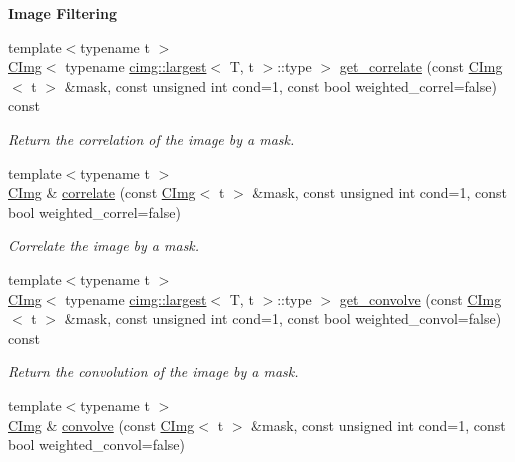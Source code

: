 \begin{Indent}{\bf Image Filtering}\par
{\em \label{_amgrp51e924689f77c6341f19cc4025b98797}
 }\begin{DoxyCompactItemize}
\item 
{\footnotesize template$<$typename t $>$ }\\\hyperlink{structcimg__library_1_1_c_img}{CImg}$<$ typename \hyperlink{structcimg__library_1_1cimg_1_1largest}{cimg::largest}$<$ T, t $>$::type $>$ \hyperlink{structcimg__library_1_1_c_img_ac97ccdd3c9e08e879a0273304c86406a}{get\_\-correlate} (const \hyperlink{structcimg__library_1_1_c_img}{CImg}$<$ t $>$ \&mask, const unsigned int cond=1, const bool weighted\_\-correl=false) const 
\begin{DoxyCompactList}\small\item\em Return the correlation of the image by a mask. \item\end{DoxyCompactList}\item 
{\footnotesize template$<$typename t $>$ }\\\hyperlink{structcimg__library_1_1_c_img}{CImg} \& \hyperlink{structcimg__library_1_1_c_img_a5c73733e5a7af93e124a7999a1dc0556}{correlate} (const \hyperlink{structcimg__library_1_1_c_img}{CImg}$<$ t $>$ \&mask, const unsigned int cond=1, const bool weighted\_\-correl=false)
\begin{DoxyCompactList}\small\item\em Correlate the image by a mask. \item\end{DoxyCompactList}\item 
{\footnotesize template$<$typename t $>$ }\\\hyperlink{structcimg__library_1_1_c_img}{CImg}$<$ typename \hyperlink{structcimg__library_1_1cimg_1_1largest}{cimg::largest}$<$ T, t $>$::type $>$ \hyperlink{structcimg__library_1_1_c_img_a828b33b7fd32dd4c929a271ca5b127cc}{get\_\-convolve} (const \hyperlink{structcimg__library_1_1_c_img}{CImg}$<$ t $>$ \&mask, const unsigned int cond=1, const bool weighted\_\-convol=false) const 
\begin{DoxyCompactList}\small\item\em Return the convolution of the image by a mask. \item\end{DoxyCompactList}\item 
{\footnotesize template$<$typename t $>$ }\\\hyperlink{structcimg__library_1_1_c_img}{CImg} \& \hyperlink{structcimg__library_1_1_c_img_ae6b437e9429c83b508a74e06d69469da}{convolve} (const \hyperlink{structcimg__library_1_1_c_img}{CImg}$<$ t $>$ \&mask, const unsigned int cond=1, const bool weighted\_\-convol=false)

\end{DoxyCompactItemize}
\end{Indent}
